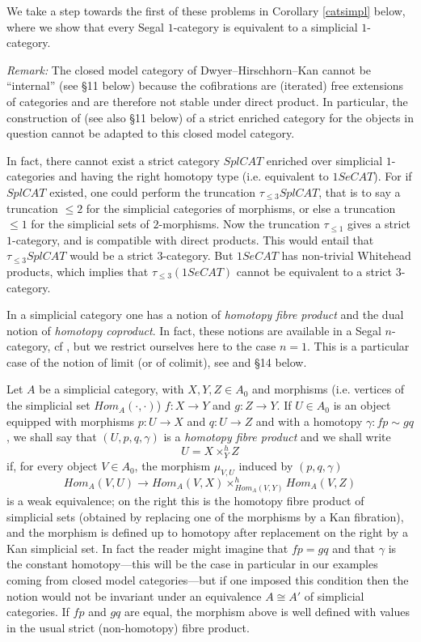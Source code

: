 We take a step towards the first of these problems in Corollary
\ref{catsimpl} below, where we show that every Segal $1$-category is
equivalent to a simplicial $1$-category.

{\em Remark:} The closed model category of Dwyer--Hirschhorn--Kan
cannot be ``internal'' (see \S 11 below) because the cofibrations
are (iterated) free extensions of categories and are therefore not stable
under direct product. In particular, the construction of \cite{nCAT}
(see also \S 11 below) of a strict enriched category for the
objects in question cannot be adapted to
this closed model category.

In fact, there cannot
exist a strict category $SplCAT$ enriched over simplicial
$1$-categories and having the right homotopy type (i.e.
equivalent to $1SeCAT$). For if $SplCAT$ existed, one could perform
the truncation $\tau _{\leq 3}SplCAT$, that is to say a truncation $\leq 2$
for the simplicial categories of morphisms, or else a truncation
$\leq 1$ for the
simplicial sets of $2$-morphisms. Now the truncation $\tau_{\leq 1}$ gives
a strict $1$-category, and is compatible with direct products. This
would entail that $\tau _{\leq 3}SplCAT$ would be a strict $3$-category.
But $1SeCAT$ has non-trivial Whitehead products, which implies
that $\tau _{\leq 3}(1SeCAT)$
cannot be equivalent to a strict $3$-category.



In a simplicial category one has a notion of {\em homotopy fibre
product} and the dual notion of {\em homotopy coproduct}. In fact, these
notions are available in a Segal $n$-category, cf \cite{limits},
but we restrict ourselves here to the case $n=1$. This is a particular case
of the notion of limit (or of
colimit), see \cite{limits} and \S 14 below.

Let $A$ be a simplicial category, with $X,Y,Z\in A_0$ and
morphisms (i.e. vertices of the simplicial set $Hom _A(\cdot , \cdot )$)
$f: X\rightarrow Y$ and $g: Z\rightarrow Y$. If $U\in A_0$ is an object
equipped with morphisms $p: U\rightarrow X$ and $q: U\rightarrow Z$ and with a
homotopy
$\gamma : fp\sim gq$, we shall say that $(U,p,q,\gamma )$ is a {\em homotopy
fibre product} and we shall write
$$
U= X\times ^h_YZ
$$
if, for every object $V\in A_0$, the morphism $\mu _{V,U}$ induced by $(p,q,
\gamma )$
$$
Hom _A(V,U)\rightarrow Hom _A(V,X)\times ^h_{Hom _A(V,Y)}Hom _A(V,Z)
$$
is a weak equivalence; on the right this is the homotopy fibre product
of simplicial sets (obtained by replacing one of the morphisms
by a Kan fibration), and the morphism is defined up to homotopy
after replacement on the right by a Kan simplicial set. In fact
the reader might imagine that $fp=gq$ and that $\gamma$ is the constant
homotopy---this will be the case in particular in our examples coming from
closed model categories---but if one imposed this condition then
the notion would not be invariant under an equivalence $A\cong A'$ of
simplicial categories. If
$fp$ and $gq$ are equal, the morphism above is well defined with values in the
usual strict (non-homotopy) fibre product.

